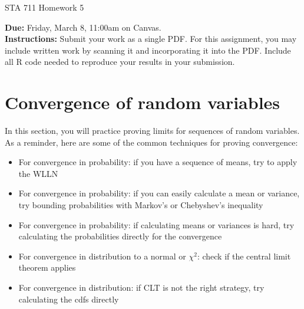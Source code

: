 \documentclass[11pt]{article}
\begin{document}
\begin{center}
\Large
STA 711 Homework 5\\
\normalsize
\vspace{5mm}
\end{center}

\noindent \textbf{Due:} Friday, March 8, 11:00am on Canvas.\\ 

\noindent \textbf{Instructions:} Submit your work as a single PDF. For this assignment, you may include written work by scanning it and incorporating it into the PDF. Include all R code needed to reproduce your results in your submission.

\section*{Convergence of random variables}

In this section, you will practice proving limits for sequences of random variables. As a reminder, here are some of the common techniques for proving convergence:

\begin{itemize}
\item For convergence in probability: if you have a sequence of means, try to apply the WLLN
\item For convergence in probability: if you can easily calculate a mean or variance, try bounding probabilities with Markov's or Chebyshev's inequality
\item For convergence in probability: if calculating means or variances is hard, try calculating the probabilities directly for the convergence
\item For convergence in distribution to a normal or $\chi^2$: check if the central limit theorem applies
\item For convergence in distribution: if CLT is not the right strategy, try calculating the cdfs directly
\end{itemize}
\end{document}
